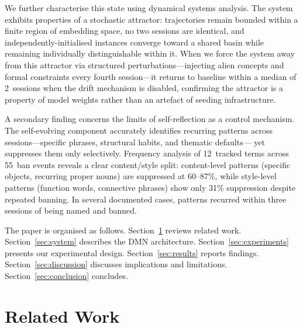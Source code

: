 \documentclass{article}
\begin{document}
We further characterise this state using dynamical systems analysis. The system
exhibits properties of a stochastic attractor: trajectories remain bounded
within a finite region of embedding space, no two sessions are identical, and
independently-initialised instances converge toward a shared basin while
remaining individually distinguishable within it. When we force the system away from this attractor via structured
perturbations---injecting alien concepts and formal constraints every fourth
session---it returns to baseline within a median of 2~sessions when the drift
mechanism is disabled, confirming the attractor is a property of model weights
rather than an artefact of seeding infrastructure.

A secondary finding concerns the limits of self-reflection as a control
mechanism. The self-evolving component accurately identifies recurring patterns
across sessions---specific phrases, structural habits, and thematic defaults---
yet suppresses them only selectively. Frequency analysis of 12~tracked terms
across 55~ban events reveals a clear content/style split: content-level
patterns (specific objects, recurring proper nouns) are suppressed at 60--87\%,
while style-level patterns (function words, connective phrases) show only 31\%
suppression despite repeated banning. In several documented
cases, patterns recurred within three sessions of being named and banned.

The paper is organised as follows. Section~\ref{sec:related} reviews related
work. Section~\ref{sec:system} describes the DMN architecture.
Section~\ref{sec:experiments} presents our experimental design.
Section~\ref{sec:results} reports findings. Section~\ref{sec:discussion}
discusses implications and limitations. Section~\ref{sec:conclusion} concludes.

\section{Related Work}
\label{sec:related}
\end{document}
